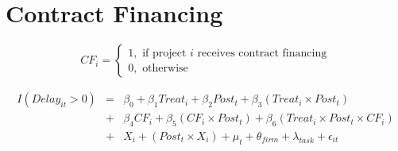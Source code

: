 \documentclass[
]{article}
\begin{document}
\begin{table}
\begin{center}
\caption{}
\label{table:coefficients}
\end{center}
\end{table}

\hypertarget{contract-financing}{%
\section{Contract Financing}\label{contract-financing}}

\[ CF_i = \begin{cases} 1, \text{ if project } i \text{ receives contract financing}\\
0, \text{ otherwise} \end{cases}\]

\[ \begin{aligned}
I(Delay_{it}>0) &=& \beta_0+\beta_1 Treat_i + \beta_2 Post_t + \beta_3 (Treat_i \times Post_t) \\
&+&\beta_4 CF_i + \beta_5 (CF_i \times Post_t) + \beta_6 (Treat_i \times Post_t \times CF_i) \\ 
&+&X_i + (Post_t \times X_i) + \mu_t + \theta_{firm} + \lambda_{task}+ \epsilon_{it}
\end{aligned}\]
\end{document}
